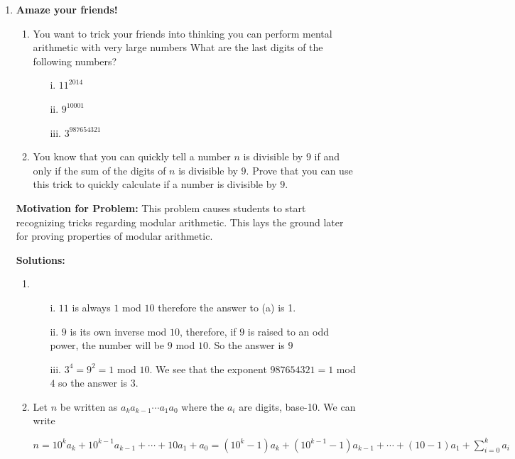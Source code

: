\documentclass[11pt]{article}
\newif\ifsolutions
\begin{document}
\maketitle

\begin{enumerate}

\item {\bf Amaze your friends!} 
\begin{enumerate}
\item You want to trick your friends into thinking you can perform mental arithmetic with very large numbers
What are the last digits of the following numbers?
\begin{enumerate}
\item[i.] \quad $11^{2014}$
\item[ii.] \quad $9^{10001}$
\item[iii.] \quad $3^{987654321}$
\end{enumerate}
\item You know that you can quickly tell a number $n$ is divisible by $9$ if and only if the sum of the digits of $n$ is divisible by $9$. Prove that you can use this trick to quickly calculate if a number is divisible by $9$.
\end{enumerate}

\ifsolutions
\textbf{Motivation for Problem:} This problem causes students to start recognizing tricks regarding modular arithmetic. This lays the ground later for proving properties of modular arithmetic.

\textbf{Solutions:}
\begin{enumerate}
\item
\begin{enumerate}
\item[i.] \quad $11$ is always $1$ mod $10$ therefore the answer to (a) is 1.
\item[ii.] \quad $9$ is its own inverse mod $10$, therefore, if $9$ is raised to an odd power, the number will be $9$ mod $10$. So the answer is $9$
\item[iii.] \quad $3^4 = 9^2 = 1 $ mod $ 10$. We see that the exponent $987654321 = 1$ mod $4$ so the answer is $3$.
\end{enumerate}
\item  Let $n$ be written as $a_k a_{k-1}\cdots a_1 a_0$ where the $a_i$ are digits, base-10.
       We can write 

       $n = 10^k a_k + 10^{k-1}a_{k-1} + \cdots + 10a_1 + a_0 = (10^k-1) a_k + (10^{k-1}-1)a_{k-1} + \cdots + (10-1)a_1 + \sum_{i=0}^k a_i$


\end{enumerate}
\end{enumerate}
\end{document}

